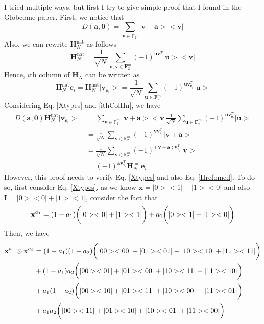 \documentclass{article}
\begin{document}
		I tried multiple ways, but first I try to give simple proof that I found in the Globcome paper. First, we notice that 
		\begin{equation}\label{Xtypes}
			D\left(\mathbf{a}, \mathbf{0}\right) = \sum_{\mathbf{v} \in \mathbb{F}_2^m}{|\mathbf{v+a}><\mathbf{v}|}
		\end{equation} 
		Also, we can rewrite $\mathbf{H}_N^{\text{nat}}$ as follows
		\begin{equation}\label{Hrefomed}
			\mathbf{H}_N^{\text{nat}} = \frac{1}{\sqrt{N}} \sum_{\mathbf{u}, \mathbf{v} \in \mathbf{F}_2^m}{\left(-1\right)^{\mathbf{u} \mathbf{v}^T } |\mathbf{u}><\mathbf{v}|}
		\end{equation}
		Hence, $i$th column of $\mathbf{H}_N$ can be written as 
		\begin{equation}\label{ithColHn}
			\mathbf{H}_N^{\text{nat}} \mathbf{e}_i = \mathbf{H}_N^{\text{nat}} | \mathbf{v}_{\mathbf{e}_i}> = \frac{1}{\sqrt{N}} \sum_{\mathbf{u} \in \mathbf{F}_2^m}{\left(-1\right)^{\mathbf{u} \mathbf{v}_{\mathbf{e}_i}^T } |\mathbf{u}>}
		\end{equation}
		Considering Eq. \eqref{Xtypes} and \eqref{ithColHn}, we have
		\begin{align*}
			D\left(\mathbf{a}, \mathbf{0} \right) \mathbf{H}_N^{\text{nat}} | \mathbf{v}_{\mathbf{e}_i} > \: & = \sum_{\mathbf{v} \in \mathbb{F}_2^m}{|\mathbf{v+a}><\mathbf{v}|}  \frac{1}{\sqrt{N}} \sum_{\mathbf{u} \in \mathbf{F}_2^m}{\left(-1\right)^{\mathbf{u} \mathbf{v}_{\mathbf{e}_i}^T } |\mathbf{u} > } \\
			& = \frac{1}{\sqrt{N}} \sum_{\mathbf{v} \in \mathbb{F}_2^m}{(-1)^{\mathbf{v}\mathbf{v}_{\mathbf{e}_i}^T } |\mathbf{v+a}>} \\
			& = \frac{1}{\sqrt{N}} \sum_{\mathbf{v} \in \mathbb{F}_2^m}{(-1)^{\left(\mathbf{v+a}\right)\mathbf{v}_{\mathbf{e}_i}^T } |\mathbf{v}>}\\
			& = (-1)^{\mathbf{a}\mathbf{v}_{\mathbf{e}_i}^T} \mathbf{H}_N^{\text{nat}} \mathbf{e}_i
		\end{align*} 
		However, this proof needs to verify Eq. \eqref{Xtypes} and also Eq. \eqref{Hrefomed}. To do so, first consider Eq. \eqref{Xtypes}, as we know $\mathbf{x} = |0><1| + |1><0|$ and also $\mathbf{I} = |0><0| + |1><1|$, consider the fact that 
		\begin{equation*}
			\mathbf{x}^{a_1}  = (1-a_1)\bigg{(}|0><0| + |1><1|\bigg{)}+a_1 \bigg{(} |0><1| + |1><0| \bigg{)}
		\end{equation*}
		Then, we have
		\begin{align*}
			\mathbf{x}^{a_1} \otimes \mathbf{x}^{a_2} &= (1-a_1)(1-a_2)\bigg{(} |00><00|+|01><01|+|10><10|+|11><11| \bigg{)}\\
			&+ (1-a_1)a_2\bigg{(} |00><01|+|01><00|+|10><11|+|11><10| \bigg{)} \\
			&+a_1(1-a_2)\bigg{(} |00><10|+|01><11|+|10><00|+|11><01| \bigg{)} \\
			&+a_1 a_2 \bigg{(} |00><11|+|01><10|+|10><01|+|11><00| \bigg{)}
		\end{align*}
\end{document}
